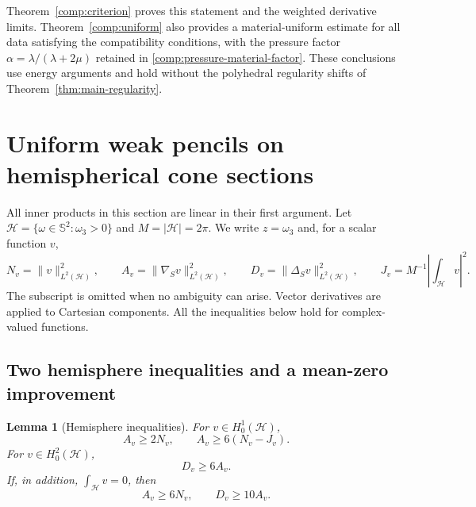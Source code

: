 \documentclass[11pt,a4paper]{article}
\newtheorem{lemma}[theorem]{Lemma}
\theoremstyle{remark}
\numberwithin{equation}{section}
\begin{document}
Theorem~\ref{comp:criterion} proves this statement and the weighted
derivative limits. Theorem~\ref{comp:uniform} also provides a
material-uniform estimate for all data satisfying the compatibility
conditions, with the pressure factor $\alpha=\lambda/(\lambda+2\mu)$
retained in \eqref{comp:pressure-material-factor}.
These conclusions use energy arguments and hold without
the polyhedral regularity shifts of Theorem~\ref{thm:main-regularity}.




\section{Uniform weak pencils on hemispherical cone sections}
\label{sec:hemispherical-pencil}

All inner products in this section are linear in their first argument.
Let $\mathcal H=\{\omega\in\mathbb S^2:\omega_3>0\}$ and
$M=|\mathcal H|=2\pi$. We write $z=\omega_3$ and, for a scalar function $v$,
\[
 N_v=\|v\|_{L^2(\mathcal H)}^2,\qquad
 A_v=\|\nabla_Sv\|_{L^2(\mathcal H)}^2,\qquad
 D_v=\|\Delta_Sv\|_{L^2(\mathcal H)}^2,\qquad
 J_v=M^{-1}\left|\int_{\mathcal H}v\right|^2.
\]
The subscript is omitted when no ambiguity can arise. Vector derivatives
are applied to Cartesian components. All the inequalities below hold for
complex-valued functions.

\subsection{Two hemisphere inequalities and a mean-zero improvement}

\begin{lemma}[Hemisphere inequalities]\label{lem:hemisphere-basic20}
For $v\in H_0^1(\mathcal H)$,
\begin{equation}\label{eq:hemisphere-poincare20}
 A_v\ge2N_v,\qquad A_v\ge6(N_v-J_v).
\end{equation}
For $v\in H_0^2(\mathcal H)$,
\begin{equation}\label{eq:hemisphere-buckling20}
 D_v\ge6A_v.
\end{equation}
If, in addition, $\int_{\mathcal H}v=0$, then
\begin{equation}\label{eq:hemisphere-zero-mean20}
 A_v\ge6N_v,\qquad D_v\ge10A_v.
\end{equation}
\end{lemma}
\end{document}

